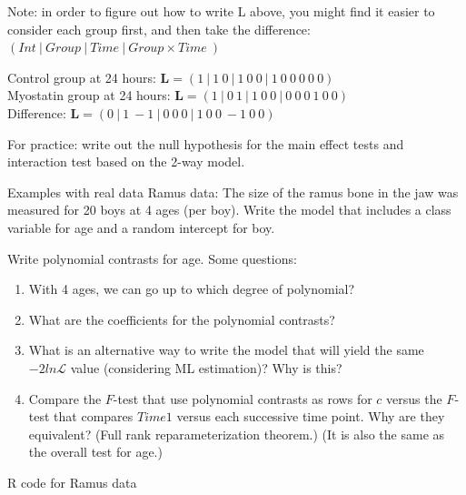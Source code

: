 \documentclass[
  9pt,
  ignorenonframetext,
]{beamer}
\begin{document}
\begin{frame}{}
\protect\hypertarget{section-4}{}
Note: in order to figure out how to write L above, you might find it
easier to consider each group first, and then take the difference:
\((Int\ |\ Group\ |\ Time\ |\ Group \times Time\ )\)

Control group at 24 hours:
\(\pmb L=(1\ |\ 1\  0\ |\  1\  0\  0\ |\ 1\  0\  0\  0\  0\  0)\)\\
Myostatin group at 24 hours:
\(\pmb L=(1\ |\ 0\  1\ |\  1\  0\  0\ |\ 0\  0\  0\  1\  0\  0)\)\\
Difference:
\(\pmb L=(0\ |\ 1\ -1\ |\  0\  0\  0\ |\ 1\  0\  0\ -1\  0\  0)\)

For practice: write out the null hypothesis for the main effect tests
and interaction test based on the 2-way model.
\end{frame}

\begin{frame}{Examples with real data}
\protect\hypertarget{examples-with-real-data}{}
Ramus data: The size of the ramus bone in the jaw was measured for 20
boys at 4 ages (per boy). Write the model that includes a class variable
for age and a random intercept for boy.
\end{frame}

\begin{frame}{Write polynomial contrasts for age.}
\protect\hypertarget{write-polynomial-contrasts-for-age.}{}
Some questions:

\begin{enumerate}
\item
  With 4 ages, we can go up to which degree of polynomial?
\item
  What are the coefficients for the polynomial contrasts?
\item
  What is an alternative way to write the model that will yield the same
  \(-2ln\mathcal L\) value (considering ML estimation)? Why is this?
\item
  Compare the \(F\)-test that use polynomial contrasts as rows for \(c\)
  versus the \(F\)-test that compares \(Time 1\) versus each successive
  time point. Why are they equivalent? (Full rank reparameterization
  theorem.) (It is also the same as the overall test for age.)
\end{enumerate}
\end{frame}

\begin{frame}{R code for Ramus data}
\protect\hypertarget{r-code-for-ramus-data}{}
\end{frame}
\end{document}
